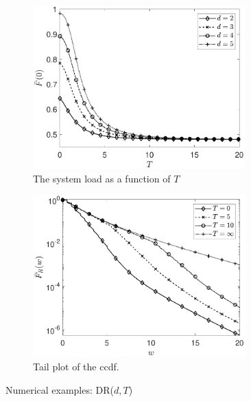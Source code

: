 \documentclass[12pt]{report}
\begin{document}
\begin{figure}[t]
	\begin{subfigure}{.44\textwidth}
		\begin{center}
		\includegraphics[width=0.9\textwidth]{figures/Chapter4/plot_Fbar0_ifoT_DRdT.pdf}
		\caption{The system load as a function of $T$}
		\label{fig:DR1}
		\end{center}
	\end{subfigure}
	\begin{subfigure}{.44\textwidth}
		\begin{center}
		\includegraphics[width=0.9\textwidth]{figures/Chapter4/plot_DR_FRbar_diffT.pdf}
		\caption{Tail plot of the ccdf.}
		\label{fig:DR3}
		\end{center}
	\end{subfigure}
	\caption{Numerical examples: DR($d,T$)}
\end{figure}
\end{document}
